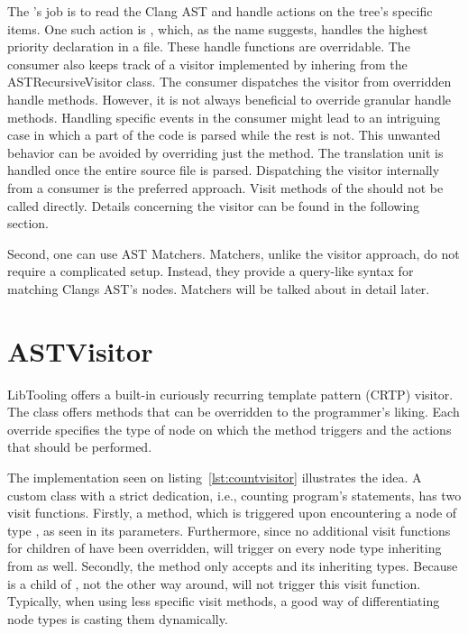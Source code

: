 The 's job is to read the Clang AST and handle actions
on the tree's specific items. 
One such action is , which, as the name suggests,
handles the highest priority declaration in a file. 
These handle functions are overridable. 
The consumer also keeps track of a visitor implemented by inhering from 
the ASTRecursiveVisitor class. 
The consumer dispatches the visitor from overridden handle methods. 
However, it is not always beneficial to override granular handle methods. 
Handling specific events in the consumer might lead to an intriguing case 
in which a part of the code is parsed while the rest is not. 
This unwanted behavior can be avoided by overriding just 
the  method. 
The translation unit is handled once the entire source file is parsed. 
Dispatching the visitor internally from a consumer is the preferred 
approach. 
Visit methods of the  should not be called 
directly. 
Details concerning the visitor can be found in the following section.

Second, one can use AST Matchers. 
Matchers, unlike the visitor approach, do not require a complicated setup. 
Instead, they provide a query-like syntax for matching Clangs AST's nodes. 
Matchers will be talked about in detail later.

\section{ASTVisitor}

LibTooling offers a built-in curiously recurring template pattern 
(CRTP) visitor. 
The class  \citep{visitor:online} 
offers  methods that 
can be overridden to the programmer's liking. 
Each override specifies the type of node on which the method 
triggers and the actions that should be performed.

The implementation seen on listing~\ref{lst:countvisitor} illustrates
the idea. A custom class with a strict dedication, i.e., counting
program's statements, has two visit functions.
Firstly, a  method, which is triggered upon
encountering a node of type , as seen in its
parameters. 
Furthermore, since no additional visit functions for children 
of  have been overridden, 
will trigger on every node type inheriting from  as well.
Secondly, the method  only accepts 
and its inheriting types.
Because  is a child of , not the other way
around,  will not trigger this visit function.
Typically, when using less specific visit methods, a good 
way of differentiating node types is casting them dynamically.

